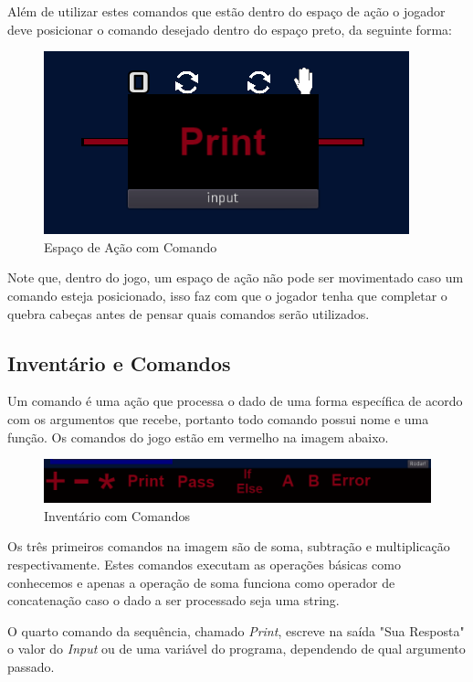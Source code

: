 Além de utilizar estes comandos que estão dentro do espaço de ação o jogador 
deve posicionar o comando desejado dentro do espaço preto, da seguinte forma:

\begin{figure}[H]
    \includegraphics[scale=0.6]{../figuras/espaco_com_comando.png}
    \caption{Espaço de Ação com Comando}
\end{figure}

Note que, dentro do jogo, um espaço de ação não pode ser movimentado caso um 
comando esteja posicionado, isso faz com que o jogador tenha que completar o
quebra cabeças antes de pensar quais comandos serão utilizados.

\subsection{Inventário e Comandos}

Um comando é uma ação que processa o dado de uma forma específica de acordo com
os argumentos que recebe, portanto todo comando possui nome e uma função.
Os comandos do jogo estão em vermelho na imagem abaixo.

\begin{figure}[H]
    \includegraphics[scale=0.5]{../figuras/inventario_comandos.png}
    \caption{Inventário com Comandos}
\end{figure}

Os três primeiros comandos na imagem são de soma, subtração e multiplicação
respectivamente. Estes comandos executam as operações básicas como conhecemos e
apenas a operação de soma funciona como operador de concatenação caso o dado a
ser processado seja uma string.

O quarto comando da sequência, chamado \textit{Print}, escreve na saída 
"Sua Resposta" o valor do \textit{Input} ou de uma variável do programa,
dependendo de qual argumento passado.

